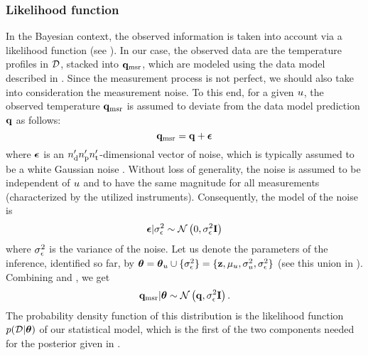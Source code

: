 \subsubsection{Likelihood function}
In the Bayesian context, the observed information is taken into account via a likelihood function (see ).
In our case, the observed data are the temperature profiles in $\mathcal{D}$, stacked into $\mathbf{q}_{\text{msr}}$, which are modeled using the data model described in .
Since the measurement process is not perfect, we should also take into consideration the measurement noise. To this end, for a given $u$, the observed temperature $\mathbf{q}_{\text{msr}}$ is assumed to deviate from the data model prediction $\mathbf{q}$ as follows:
\begin{equation} \elabel{noisy-measurements}
  \mvT_\meas = \mvT + \vnoise
\end{equation}
where $\boldsymbol\epsilon$ is an ${n_\text{d}'} {n_\text{p}'} {n_\text{t}'}$-dimensional vector of noise, which is typically assumed to be a white Gaussian noise \cite{rasmussen2006, marzouk2009}.
Without loss of generality, the noise is assumed to be independent of $u$ and to have the same magnitude for all measurements (characterized by the utilized instruments). Consequently, the model of the noise is
\begin{equation} \elabel{noise-model}
  \vnoise | \sigma^2_\noise \sim \gaussian{0}{\sigma^2_\noise \mI}
\end{equation}
where $\sigma^2_\epsilon$ is the variance of the noise.
Let us denote the parameters of the inference, identified so far, by ${\boldsymbol\theta} = {\boldsymbol\theta}_u \cup \{ \sigma_\epsilon^2 \} = \{ \mathbf{z}, \mu_u, \sigma_u^2, \sigma_\epsilon^2 \}$ (see this union in ).
Combining  and , we get
\begin{equation} \elabel{likelihood}
  \mvT_\meas | \vparam \sim \gaussian{\mvT}{\sigma_\noise^2 \mI}.
\end{equation}
The probability density function of this distribution is the likelihood function $\f{\Data | \vparam}$ of our statistical model, which is the first of the two components needed for the posterior given in .

